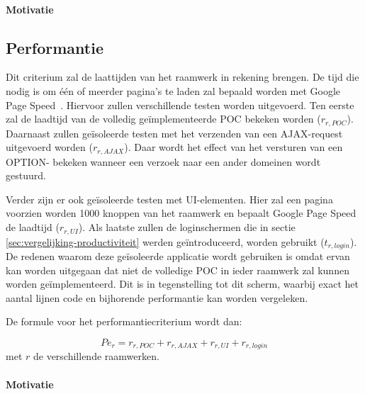 \paragraph{Motivatie}


\subsection{Performantie}
\label{sec:vergelijking-performantie}
Dit criterium zal de laattijden van het raamwerk in rekening brengen.
De tijd die nodig is om één of meerder pagina's te laden zal bepaald worden met Google Page Speed~\cite{Morgan2011}. 
Hiervoor zullen verschillende testen worden uitgevoerd. 
Ten eerste zal de laadtijd van de volledig geïmplementeerde POC bekeken worden ($r_{r,POC}$). 
Daarnaast zullen geïsoleerde testen met het verzenden van een AJAX-request uitgevoerd worden ($r_{r,AJAX}$).
Daar wordt het effect van het versturen van een OPTION- bekeken wanneer een verzoek naar een ander domeinen wordt gestuurd.

Verder zijn er ook geïsoleerde testen met UI-elementen. 
Hier zal een  pagina voorzien worden 1000 knoppen van het raamwerk en bepaalt Google Page Speed de laadtijd ($r_{r,UI}$). 
Als laatste zullen de loginschermen die in sectie \ref{sec:vergelijking-productiviteit} werden geïntroduceerd, worden gebruikt ($t_{r,login}$). 
De redenen waarom deze geïsoleerde applicatie wordt gebruiken is omdat ervan kan worden uitgegaan dat niet de volledige POC in ieder raamwerk zal kunnen worden geïmplementeerd. 
Dit is in tegenstelling tot dit scherm, waarbij exact het aantal lijnen code en bijhorende performantie kan worden vergeleken.

De formule voor het performantiecriterium wordt dan: 

\begin{equation}
  Pe_r=r_{r,POC}+r_{r,AJAX}+r_{r,UI}+r_{r,login} 
  \label{eq:performantie}
\end{equation}
met $r$ de verschillende raamwerken.

\paragraph{Motivatie}

